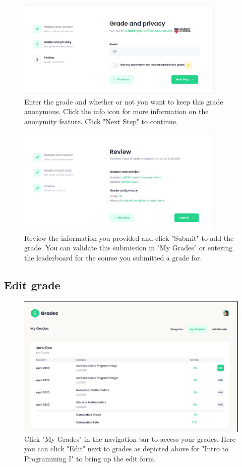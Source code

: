 \begin{figure}[H]
    \centering
    \includegraphics[width=10cm]{images/user-guide/add-grade/2.jpg}
    \caption{Enter the grade and whether or not you want to keep this grade anonymous. Click the info icon for more information on the anonymity feature. Click "Next Step" to continue.}
    \label{fig:addgrade1}
\end{figure}

\begin{figure}[H]
    \centering
    \includegraphics[width=10cm]{images/user-guide/add-grade/3.jpg}
    \caption{Review the information you provided and click "Submit" to add the grade. You can validate this submission in "My Grades" or entering the leaderboard for the course you submitted a grade for.}
    \label{fig:addgrade1}
\end{figure}

\subsection{Edit grade}\label{sec:editgrade}

\begin{figure}[H]
    \centering
    \includegraphics[width=15cm]{images/user-guide/edit-grade/1.jpg}
    \caption{Click "My Grades" in the navigation bar to access your grades. Here you can click "Edit" next to grades as depicted above for "Intro to Programming I" to bring up the edit form.}
    \label{fig:editgrade1}
\end{figure}

